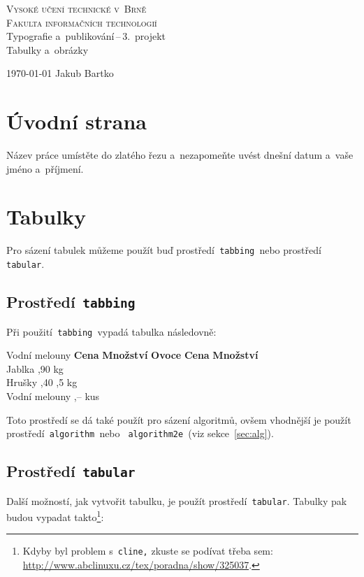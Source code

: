 \documentclass[a4paper, 11pt]{article}
\begin{document}
\begin{titlepage}
    \begin{center}
        \Huge
        \textsc{Vysoké učení technické v~Brně} \\
        \huge
        \textsc{Fakulta informačních technologií} \\
        \LARGE
        Typografie a~publikování\,--\,3.~projekt \\
        \Huge
        Tabulky a~obrázky\\
    \end{center}
    {\Large
        \today\hfill
        Jakub Bartko
    }
\end{titlepage}

\section{Úvodní strana}
Název práce umístěte do zlatého řezu a~nezapomeňte uvést dnešní datum a~vaše jméno a~příjmení.

\section{Tabulky}
Pro sázení tabulek můžeme použít buď prostředí\texttt{ tabbing }nebo prostředí\texttt{ tabular}.

\subsection{Prostředí\texttt{ tabbing}}
Při použití\texttt{ tabbing }vypadá tabulka následovně:
\begin{tabbing}
  Vodní melouny \quad \=\textbf{Cena} \quad \= \textbf{Množství}  \quad  \kill
  \textbf{Ovoce}    \> \textbf{Cena}    \> \textbf{Množství}  \\
  Jablka            ,90             kg     \\
  Hrušky            ,40            ,5 kg   \\
  Vodní melouny     ,--              kus    \\
\end{tabbing}
Toto prostředí se dá také použít pro sázení algoritmů, ovšem vhodnější je použít prostředí\texttt{ algorithm }nebo \texttt{ algorithm2e }(viz sekce~\ref{sec:alg}). 

\subsection{Prostředí\texttt{ tabular}}
Další možností, jak vytvořit tabulku, je použít prostředí\texttt{ tabular}. Tabulky pak budou vypadat takto\footnote{Kdyby byl problem s\texttt{ cline,} zkuste se podívat  třeba sem: \href{http://www.abclinuxu.cz/tex/poradna/show/325037}{http://www.abclinuxu.cz/tex/poradna/show/325037}.}: \\
\end{document}

